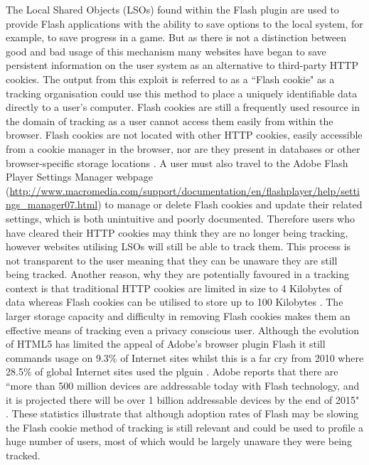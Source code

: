 \documentclass[12pt]{article}
\begin{document}
The Local Shared Objects (LSOs) found within the Flash plugin are used to provide Flash applications with the ability to save options to the local system, for example, to save progress in a game. But as there is not a distinction between good and bad usage of this mechanism many websites have began to save persistent information on the user system as an alternative to third-party HTTP cookies. The output from this exploit is referred to as a ``Flash cookie" as a tracking organisation could use this method to place a uniquely identifiable data directly to a user's computer. Flash cookies are still a frequently used resource in the domain of tracking as a user cannot access them easily from within the browser. Flash cookies are not located with other HTTP cookies, easily accessible from a cookie manager in the browser, nor are they present in databases or other browser-specific storage locations \parencite{flashCookies}. A user must also travel to the Adobe Flash Player Settings Manager webpage (\url{http://www.macromedia.com/support/documentation/en/flashplayer/help/settings_manager07.html}) to manage or delete Flash cookies and update their related settings, which is both unintuitive and poorly documented. Therefore users who have cleared their HTTP cookies may think they are no longer being tracking, however websites utilising LSOs will still be able to track them. This process is not transparent to the user meaning that they can be unaware they are still being tracked. Another reason, why they are potentially favoured in a tracking context is that traditional HTTP cookies are limited in size to 4 Kilobytes of data whereas Flash cookies can be utilised to store up to 100 Kilobytes \parencite{flashCookies}. The larger storage capacity and difficulty in removing Flash cookies makes them an effective means of tracking even a privacy conscious user. Although the evolution of HTML5 has limited the appeal of Adobe's browser plugin Flash it still commands usage on 9.3\% of Internet sites whilst this is a far cry from 2010 where 28.5\% of global Internet sites used the plguin \parencite{flashStats}. Adobe reports that there are ``more than 500 million devices are addressable today with Flash technology, and it is projected there will be over 1 billion addressable devices by the end of 2015" \parencite{adobeFlash}. These statistics illustrate that although adoption rates of Flash may be slowing the Flash cookie method of tracking is still relevant and could be used to profile a huge number of users, most of which would be largely unaware they were being tracked. \newline 
\end{document}
